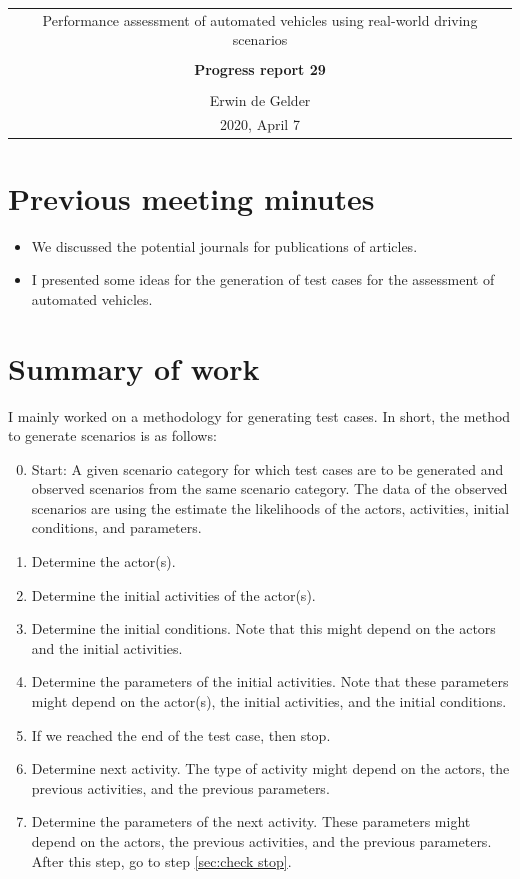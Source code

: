 \documentclass[10pt,final,a4paper,oneside,onecolumn]{article}
\newcommand{\progressreportnumber}{29}
\renewcommand{\author}{Erwin de Gelder}
\renewcommand{\date}{2020, April 7}
\renewcommand{\title}{Performance assessment of automated vehicles using real-world driving scenarios}
\begin{document}
	
\begin{center}
	\begin{tabular}{c}
		\title \\ \\
		\textbf{\huge Progress report \progressreportnumber} \\ \\
		\author \\ 
		\date
	\end{tabular}
\end{center}

\section{Previous meeting minutes}

\begin{itemize}
	\item We discussed the potential journals for publications of articles.
	\item I presented some ideas for the generation of test cases for the assessment of automated vehicles.
\end{itemize}

\section{Summary of work}

I mainly worked on a methodology for generating test cases. In short, the method to generate scenarios is as follows:

\begin{enumerate}
	\setcounter{enumi}{-1}
	\item Start: A given scenario category for which test cases are to be generated and observed scenarios from the same scenario category. The data of the observed scenarios are using the estimate the likelihoods of the actors, activities, initial conditions, and parameters.
	\item Determine the actor(s).
	\item Determine the initial activities of the actor(s).
	\item Determine the initial conditions. Note that this might depend on the actors and the initial activities.
	\item Determine the parameters of the initial activities. Note that these parameters might depend on the actor(s), the initial activities, and the initial conditions.
	\item If we reached the end of the test case, then stop. \label{sec:check stop}
	\item Determine next activity. The type of activity might depend on the actors, the previous activities, and the previous parameters.
	\item Determine the parameters of the next activity. These parameters might depend on the actors, the previous activities, and the previous parameters. After this step, go to step \ref{sec:check stop}.
\end{enumerate}
\end{document}
